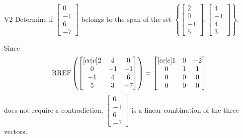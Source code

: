 \begin{problem}{V2}
  Determine if
  \(\begin{bmatrix} 0 \\ -1 \\ 6 \\ -7 \end{bmatrix}\)
  belongs to the span of the set
  \(\left\{
    \begin{bmatrix} 2 \\ 0 \\ -1 \\ 5 \end{bmatrix},
    \begin{bmatrix} 4 \\ -1 \\ 4 \\ 3 \end{bmatrix}
    \right\}
  \).
\end{problem}
\begin{solution}
  Since
  \[
    \operatorname{RREF}\left(
      \begin{bmatrix}[cc|c]
        2 & 4 & 0 \\
        0 & -1 & -1 \\
        -1 & 4 & 6 \\
        5 & 3 & -7
      \end{bmatrix}
    \right) =
    \begin{bmatrix}[cc|c]
      1 & 0 & -2 \\
      0 & 1 & 1 \\
      0 & 0 & 0 \\
      0 & 0 & 0
    \end{bmatrix}
  \]
  does not require a contradiction,
  \(\begin{bmatrix} 0 \\ -1 \\ 6 \\ -7 \end{bmatrix}\) is
  a linear combination of the three vectors.
\end{solution}


